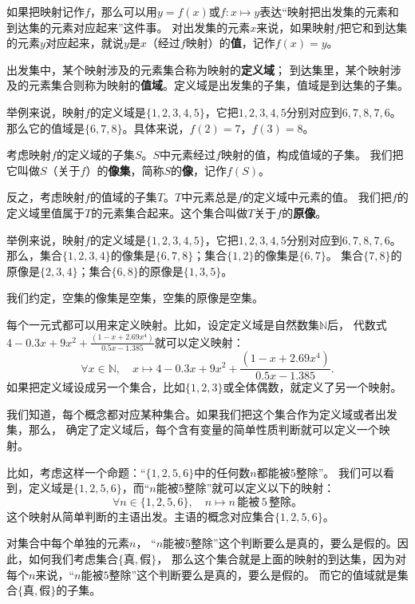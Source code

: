 \documentclass[12pt,UTF8]{ctexbook}
\begin{document}
如果把映射记作$f$，那么可以用$y = f(x)$或$f:x\mapsto y$表达“映射把出发集的元素和到达集的元素对应起来”这件事。
对出发集的元素$x$来说，如果映射$f$把它和到达集的元素$y$对应起来，就说$y$是$x$（经过$f$映射）的\textbf{值}，记作$f(x) = y$。

出发集中，某个映射涉及的元素集合称为映射的\textbf{定义域}；
到达集里，某个映射涉及的元素集合则称为映射的\textbf{值域}。定义域是出发集的子集，值域是到达集的子集。

举例来说，映射$f$的定义域是$\{1,2,3,4,5\}$，它把$1,2,3,4,5$分别对应到$6,7,8,7,6$。
那么它的值域是$\{6,7,8\}$。具体来说，$f(2) = 7$，$f(3) = 8$。

考虑映射$f$的定义域的子集$S$。$S$中元素经过$f$映射的值，构成值域的子集。
我们把它叫做$S$（关于$f$）的\textbf{像集}，简称$S$的\textbf{像}，记作$f(S)$。

反之，考虑映射$f$的值域的子集$T$。$T$中元素总是$f$的定义域中元素的值。
我们把$f$的定义域里值属于$T$的元素集合起来。这个集合叫做$T$关于$f$的\textbf{原像}。

举例来说，映射$f$的定义域是$\{1,2,3,4,5\}$，它把$1,2,3,4,5$分别对应到$6,7,8,7,6$。
那么，集合$\{1,2,3,4\}$的像集是$\{6,7,8\}$；集合$\{1,2\}$的像集是$\{6,7\}$。
集合$\{7,8\}$的原像是$\{2,3,4\}$；集合$\{6,8\}$的原像是$\{1,3,5\}$。

我们约定，空集的像集是空集，空集的原像是空集。

每个一元式都可以用来定义映射。比如，设定定义域是自然数集$\mathbb{N}$后，
代数式$4-0.3x+9x^2+\frac{(1-x+2.69x^4)}{0.5x-1.385}$就可以定义映射：
$$ \forall x\in\mathbb{N}, \quad x \mapsto 4-0.3x+9x^2+\frac{(1-x+2.69x^4)}{0.5x-1.385}. $$
如果把定义域设成另一个集合，比如$\{1,2,3\}$或全体偶数，就定义了另一个映射。

我们知道，每个概念都对应某种集合。如果我们把这个集合作为定义域或者出发集，那么，
确定了定义域后，每个含有变量的简单性质判断就可以定义一个映射。

比如，考虑这样一个命题：“$\{1,2,5,6\}$中的任何数$n$都能被$5$整除”。
我们可以看到，定义域是$\{1,2,5,6\}$，而“$n$能被$5$整除”就可以定义以下的映射：
$$ \forall n\in \{1,2,5,6\} , \quad n \mapsto n\,\mbox{能被}\,5\,\mbox{整除。} $$
这个映射从简单判断的主语出发。主语的概念对应集合$\{1,2,5,6\}$。

对集合中每个单独的元素$n$，
“$n$能被$5$整除”这个判断要么是真的，要么是假的。因此，如何我们考虑集合$\{\mbox{真}, \mbox{假}\}$，
那么这个集合就是上面的映射的到达集，因为对每个$n$来说，“$n$能被$5$整除”这个判断要么是真的，要么是假的。
而它的值域就是集合$\{\mbox{真}, \mbox{假}\}$的子集。
\end{document}
